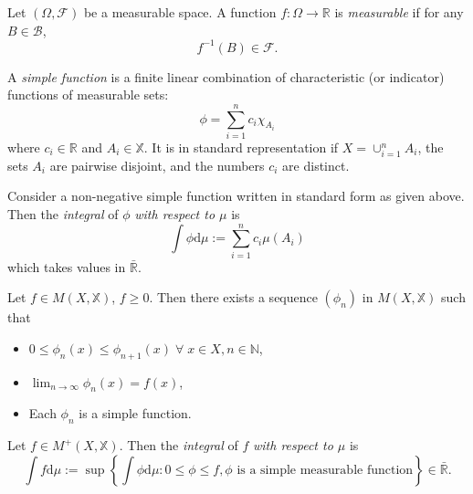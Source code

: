 \begin{definition}
    Let $(\Omega,\mathcal{F})$ be a measurable space. A function $f:\Omega\rightarrow\mathbb{R}$
    is \emph{measurable} if for any $B\in\mathcal{B}$,
    \begin{equation*}
        f^{-1}(B)\in\mathcal{F}.
    \end{equation*}
\end{definition}

\begin{definition}
    A \emph{simple function} is a finite linear combination of 
    characteristic (or indicator) functions of measurable sets:
    \begin{equation}
        \phi=\sum_{i=1}^nc_i\chi_{A_i}
    \end{equation}
    where $c_i\in\mathbb{R}$ and $A_i\in\mathbb{X}$.
    It is in standard representation if $X=\cup_{i=1}^nA_i$,
    the sets $A_i$ are pairwise disjoint, and the numbers $c_i$
    are distinct.
\end{definition}

\begin{definition}
    Consider a non-negative simple function written in standard form as given above.
    Then the \emph{integral} of $\phi$ \emph{with respect to $\mu$} is
    \begin{equation}
        \int\phi\mathrm d\mu:=\sum_{i=1}^nc_i\mu(A_i)
    \end{equation}
    which takes values in $\bar{\mathbb{R}}$.
\end{definition}

\begin{lemma}
    Let $f\in M(X,\mathbb{X})$, $f\geq0.$ Then there exists a sequence
    $(\phi_n)$ in $M(X,\mathbb{X})$ such that
    \begin{itemize}
        \item $0\leq\phi_n(x)\leq\phi_{n+1}(x)\;\forall\;x\in X,n\in\mathbb{N}$,
        \item $\lim_{n\rightarrow\infty}\phi_n(x)=f(x)$,
        \item Each $\phi_n$ is a simple function.
    \end{itemize}
\end{lemma}

\begin{definition}
    Let $f\in M^+(X,\mathbb{X})$. Then the \emph{integral} of $f$ 
    \emph{with respect to $\mu$} is 
    \begin{equation*}
        \int f\mathrm d\mu := \sup\left\{\int\phi\mathrm d\mu : 0\leq\phi\leq f, \phi\textrm{ is a simple measurable function}\right\}\in\bar{\mathbb{R}}.
    \end{equation*}
\end{definition}

